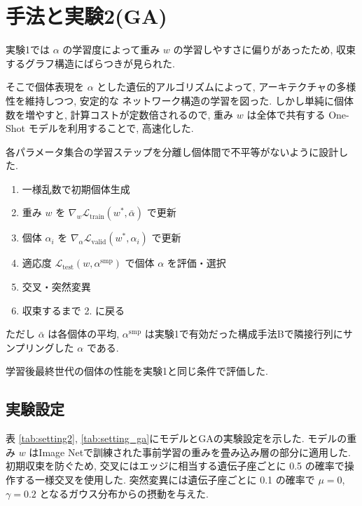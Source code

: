 \documentclass[twocolumn]{jarticle}     %
\begin{document}
\section{手法と実験2(GA)}
実験1では $\alpha$ の学習度によって重み $w$ の学習しやすさに偏りがあったため,
収束するグラフ構造にばらつきが見られた.

そこで個体表現を $\alpha$ とした遺伝的アルゴリズムによって,
アーキテクチャの多様性を維持しつつ, 安定的な
ネットワーク構造の学習を図った.
しかし単純に個体数を増やすと, 計算コストが定数倍されるので,
重み $w$ は全体で共有する One-Shot モデルを利用することで,
高速化した.

各パラメータ集合の学習ステップを分離し個体間で不平等がないように設計した.

\begin{enumerate}
  \item 一様乱数で初期個体生成
  \item 重み $w$ を $\displaystyle \nabla_w \mathcal{L}_{\mathrm{train}}(w^*, \bar{\alpha})$ で更新
  \item 個体 $\alpha_i$ を $\displaystyle \nabla_\alpha \mathcal{L}_{\mathrm{valid}}(w^*, \alpha_i)$ で更新
  \item 適応度 $\displaystyle \mathcal{L}_{\mathrm{test}}(w, \alpha^\mathrm{smp})$ で個体 $\alpha$ を評価・選択
  \item 交叉・突然変異
  \item 収束するまで 2. に戻る
\end{enumerate}
ただし
$\bar{\alpha}$ は各個体の平均,
$\alpha^\mathrm{smp}$ は実験1で有効だった構成手法Bで隣接行列にサンプリングした $\alpha$ である.

学習後最終世代の個体の性能を実験1と同じ条件で評価した.


\subsection{実験設定}

表 \ref{tab:setting2}, \ref{tab:setting_ga}にモデルとGAの実験設定を示した.
モデルの重み $w$ はImage Netで訓練された事前学習の重みを畳み込み層の部分に適用した.
初期収束を防ぐため, 交叉にはエッジに相当する遺伝子座ごとに 0.5 の確率で操作する一様交叉を使用した.
突然変異には遺伝子座ごとに 0.1 の確率で $\mu=0$, $\gamma=0.2$ となるガウス分布からの摂動を与えた.
\end{document}
